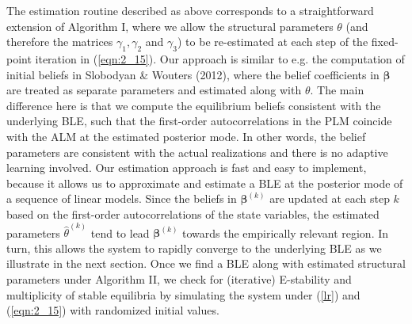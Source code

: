 
The estimation routine described as above corresponds to a straightforward extension of Algorithm I, where we allow the structural  parameters $\theta$ (and therefore the matrices $\gamma_1, \gamma_2 $ and $\gamma_3$) to be re-estimated at each step of the fixed-point iteration in (\ref{eqn:2_15}). Our approach is similar to e.g. the computation of initial beliefs in Slobodyan \& Wouters (2012), where the belief coefficients in $\pmb{\beta}$ are treated as separate parameters and estimated along with $\theta$. The main difference here is that we compute the equilibrium beliefs consistent with the underlying {BLE}, such that the first-order autocorrelations in the PLM coincide with the ALM at the estimated posterior mode. In other words, the belief parameters are  consistent with the actual realizations and there is no adaptive learning involved.
Our estimation approach is fast and easy to implement, because it allows us to approximate and estimate a BLE at the posterior mode of a sequence of linear models. Since the beliefs in $\pmb {\beta}^{(k)}$ are updated at each step $k$ based on the first-order autocorrelations of the state variables, the estimated parameters  $\hat{\theta}^{(k)}$ tend to lead $\pmb { \beta}^{(k)}$ towards the empirically relevant region. In turn, this allows the system to rapidly converge to the underlying {BLE} as we illustrate in the next section. Once we find a BLE along with estimated structural parameters under Algorithm II, we check for (iterative) E-stability and multiplicity of stable equilibria by simulating the system under (\ref{lr}) and (\ref{eqn:2_15})   with randomized initial values. 

